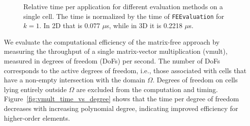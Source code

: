 \documentclass[11pt,a4paper]{article}
\begin{document}
\begin{figure}[!ht]
{
    }
    \caption{Relative time per application for different evaluation methods on a single cell. The time is
        normalized by the time of \texttt{FEEvaluation} for $k=1$. In 2D that is 0.077 $\mu$s, while in 3D it is 0.2218
        $\mu$s.}
    \label{fig:single_cell_performance}
\end{figure}

We evaluate the computational efficiency of the matrix-free approach by measuring the throughput of a single
matrix-vector multiplication (vmult), measured in degrees of freedom (DoFs) per second. The number of DoFs corresponds
to the active degrees of freedom, i.e., those associated with cells that have a non-empty intersection with the domain
$\Omega$. Degrees of freedom on cells lying entirely outside $\Omega$ are excluded from the computation and timing.
Figure~\ref{fig:vmult_time_vs_degree} shows that the time per degree of freedom decreases with increasing polynomial
degree, indicating improved efficiency for higher-order elements.
\end{document}
